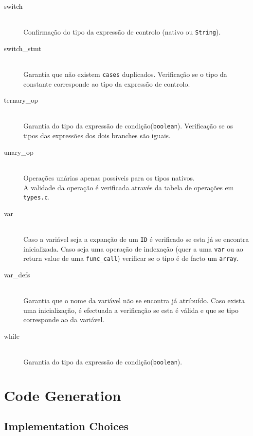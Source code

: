 \documentclass[a4paper]{article}
\begin{document}
\begin{description}
	\item [switch] \hfill \\
		Confirmação do tipo da expressão de controlo (nativo ou \texttt{String}).
	
	\item [switch\_stmt] \hfill \\
		Garantia que não existem \texttt{cases} duplicados.
		Verificação se o tipo da constante corresponde ao tipo da expressão de controlo.

	\item [ternary\_op] \hfill \\
		Garantia do tipo da expressão de condição(\texttt{boolean}).
		Verificação se os tipos das expressões dos dois branches são iguais.

	\item [unary\_op] \hfill \\
		Operações unárias apenas possíveis para os tipos nativos. \\
		A validade da operação é verificada através da tabela de operações em \texttt{types.c}.

	\item [var] \hfill \\
		Caso a variável seja a expanção de um \texttt{ID} é verificado se esta já se encontra inicializada.
		Caso seja uma operação de indexação (quer a uma \texttt{var} ou ao return value de uma \texttt{func\_call}) verificar se o tipo é de facto um \texttt{array}. 
 
	\item [var\_defs] \hfill \\
		Garantia que o nome da variável não se encontra já atribuído.
		Caso exista uma inicialização, é efectuada a verificação se esta é válida e que se tipo corresponde ao da variável.

	\item [while] \hfill \\
		Garantia do tipo da expressão de condição(\texttt{boolean}).
\end{description}

\cleardoublepage

\section{Code Generation}
\subsection{Implementation Choices}
\end{document}
